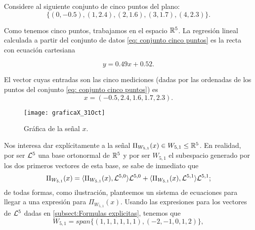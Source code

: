 \begin{ej}
Considere al siguiente conjunto de cinco
puntos del plano:
\begin{equation} \label{eq: conjunto cinco puntos}
\{ (0,-0.5), (1,2.4), (2, 1.6), (3,1.7), (4, 2.3) \}.
\end{equation}

\begin{minipage}{0.5\textwidth}
Como tenemos cinco puntos, trabajamos
en el espacio $\mathbb{R}^{5}$. 
La regresión lineal calculada a partir
del conjunto de datos
\eqref{eq: conjunto cinco puntos}
es la recta
con ecuación cartesiana

\begin{equation} \label{eq: recta minimos cuadrados}
y=0.49x+0.52.
\end{equation}

El vector cuyas entradas
son las cinco mediciones (dadas por las ordenadas
de los puntos del conjunto \eqref{eq: conjunto cinco puntos})
es
\begin{equation}
\label{eq0: 29Nov}
x=(-0.5, 2.4, 1.6, 1.7, 2.3).
\end{equation}

\end{minipage} \hfill
\begin{minipage}{0.45\textwidth}


\begin{figure}[H]
\centering\captionsetup{format = hang}
	\begin{measuredfigure}
		\texttt{[image: graficaX\_31Oct]} 
		\caption{Gráfica de la señal $x$.}
 	\end{measuredfigure}
 \end{figure}


\end{minipage}

\vspace{1cm}

Nos interesa
dar explícitamente a 
la señal $\Pi_{W_{5,1}}(x) \in W_{5,1} \leq \mathbb{R}^{5}$.
En realidad, por ser $\mathcal{L}^{5}$ 
una base ortonormal de $\mathbb{R}^{5}$ y por ser
$W_{5,1}$ el subespacio generado por los
dos primeros vectores de esta base, 
se sabe de inmediato que
\[
\Pi_{W_{5,1}}(x)=  \langle \Pi_{W_{5,1}}(x), \mathcal{L}^{5,0} \rangle \mathcal{L}^{5,0}
+ \langle \Pi_{W_{5,1}}(x), \mathcal{L}^{5,1} \rangle \mathcal{L}^{5,1};
\]
de todas formas, como ilustración, planteemos un sistema
de ecuaciones para llegar a una expresión para
$\Pi_{W_{5,1}}(x)$.
Usando las expresiones para los vectores
de $\mathcal{L}^{5}$
dadas en \ref{subsect:Formulas explicitas},
tenemos que
\[
W_{5,1}=span\{ (1,1,1,1,1,1), (-2, -1, 0, 1, 2) \},
\]


\end{ej}
